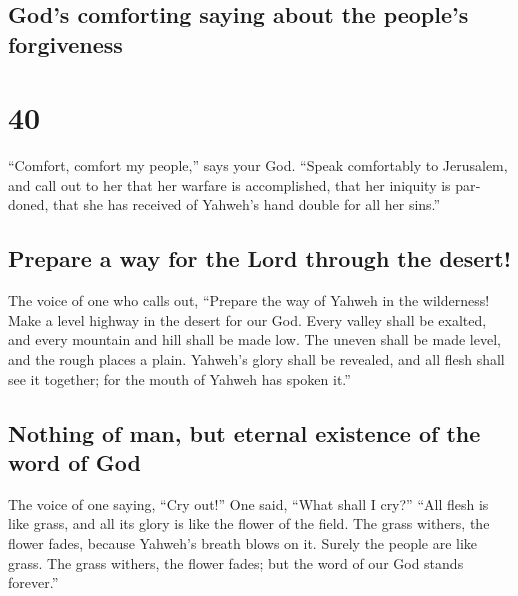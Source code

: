 \begin{paracol}{2}
\switchcolumn
\begin{otherlanguage}{english}

\hypertarget{gods-comforting-saying-about-the-peoples-forgiveness}{%
\subsection{God's comforting saying about the people's
forgiveness}\label{gods-comforting-saying-about-the-peoples-forgiveness}}

\hypertarget{section-79}{%
\section{40}\label{section-79}}

 ``Comfort, comfort my people,'' says your God.
 ``Speak comfortably to Jerusalem, and call out to her
that her warfare is accomplished, that her iniquity is pardoned, that
she has received of Yahweh's hand double for all her sins.''

\hypertarget{prepare-a-way-for-the-lord-through-the-desert}{%
\subsection{Prepare a way for the Lord through the
desert!}\label{prepare-a-way-for-the-lord-through-the-desert}}

 The voice of one who calls out, ``Prepare the way of
Yahweh in the wilderness! Make a level highway in the desert for our
God.  Every valley shall be exalted, and every mountain
and hill shall be made low. The uneven shall be made level, and the
rough places a plain.  Yahweh's glory shall be revealed,
and all flesh shall see it together; for the mouth of Yahweh has spoken
it.''

\hypertarget{nothing-of-man-but-eternal-existence-of-the-word-of-god}{%
\subsection{Nothing of man, but eternal existence of the word of
God}\label{nothing-of-man-but-eternal-existence-of-the-word-of-god}}

 The voice of one saying, ``Cry out!'' One said, ``What
shall I cry?'' ``All flesh is like grass, and all its glory is like the
flower of the field.  The grass withers, the flower fades,
because Yahweh's breath blows on it. Surely the people are like grass.
 The grass withers, the flower fades; but the word of our
God stands forever.''


\end{otherlanguage}
\end{paracol}
